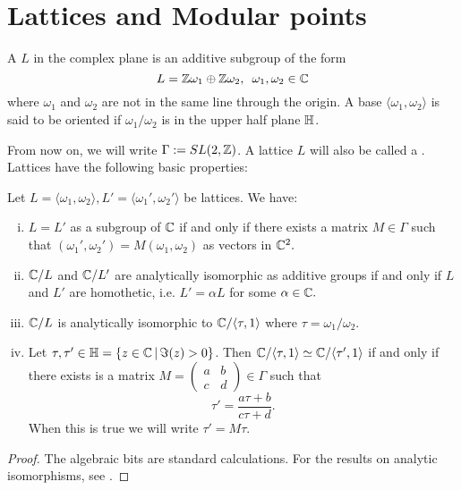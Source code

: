\documentclass[12pt, a4paper]{report}
\begin{document}
\section{Lattices and Modular points}

\begin{defn}
  A  $L$ in the complex plane is an additive subgroup of the form
  \[L = {\mathbb Z}\omega_1 \oplus {\mathbb Z}\omega_2, \,\,\, \omega_1, \omega_2 \in {\mathbb C} \]
  where $\omega_1$ and $\omega_2$ are not in the same line through the origin.
  A base $\langle \omega_1, \omega_2 \rangle$ is said to be oriented if
  $\omega_1/\omega_2$ is in the upper half plane $\mathbb{H}$.
\end{defn}

From now on, we will write $\Gamma := SL(2,{\mathbb Z})$.
A lattice $L$ will also be called a .
Lattices have the following basic properties:
\begin{prop} \label{lattice}
  Let $L = \langle \omega_1, \omega_2 \rangle, L' = \langle \omega_1', \omega_2'
  \rangle$ be lattices. We have:
  \begin{enumerate}[(i)]
  \item $L = L'$ as a subgroup of ${\mathbb C}$ if and only if there exists a matrix $M
    \in \Gamma$ such that $(\omega_1', \omega_2') = M (\omega_1, \omega_2)$
    as vectors in ${\mathbb C}^2.$
  \item ${\mathbb C} / L$ and ${\mathbb C} / L'$ are analytically isomorphic as additive groups
    if and only if $L$ and $L'$ are homothetic, i.e.
    $L' = \alpha L$ for some $\alpha \in {\mathbb C}.$
  \item ${\mathbb C} / L$ is analytically isomorphic to ${\mathbb C} /\langle \tau, 1
    \rangle$ where $\tau = \omega_1/\omega_2$.
  \item Let $\tau, \tau' \in \mathbb{H} = \{z \in {\mathbb C} \, | \, \Im(z) > 0 \}$.
    Then ${\mathbb C} / \langle \tau, 1 \rangle \simeq {\mathbb C} / \langle \tau', 1 \rangle$
  if and only if there exists is a matrix $M = \left(
    \begin{smallmatrix}
      a & b \\ c & d
    \end{smallmatrix} \right) \in \Gamma$
    such that
    \[\tau' = \frac{a\tau+b}{c\tau +d}. \]
    When this is true we will write $\tau' = M\tau$.
  \end{enumerate}
\end{prop}
\begin{proof}
  The algebraic bits are standard calculations. For the results on analytic
  isomorphisms, see \cite[Appendix B.6, pages 168-169]{simple}.
\end{proof}
\end{document}
